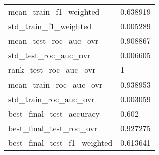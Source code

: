\begin{tabular}{ll}
mean\_train\_f1\_weighted        &                                           0.638919 \\
std\_train\_f1\_weighted         &                                           0.005289 \\
mean\_test\_roc\_auc\_ovr         &                                           0.908867 \\
std\_test\_roc\_auc\_ovr          &                                           0.006605 \\
rank\_test\_roc\_auc\_ovr         &                                                  1 \\
mean\_train\_roc\_auc\_ovr        &                                           0.938953 \\
std\_train\_roc\_auc\_ovr         &                                           0.003059 \\
best\_final\_test\_accuracy      &                                              0.602 \\
best\_final\_test\_roc\_ovr       &                                           0.927275 \\
best\_final\_test\_f1\_weighted   &                                           0.613641 \\
\bottomrule
\end{tabular}
